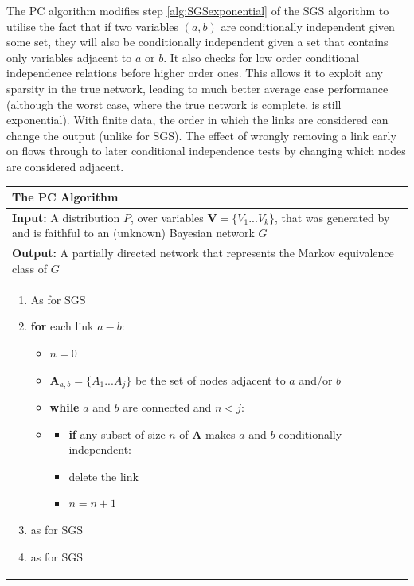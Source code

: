 \documentclass[11pt,a4paper,oneside]{book}
\theoremstyle{plain}
\theoremstyle{definition}
\begin{document}
The PC algorithm \citet{Sprites2000} modifies step \ref{alg:SGSexponential} of the SGS algorithm to utilise the fact that if two variables $(a,b)$ are conditionally independent given some set, they will also be conditionally independent given a set that contains only variables adjacent to $a$ or $b$. It also checks for low order conditional independence relations before higher order ones. This allows it to exploit any sparsity in the true network, leading to much better average case performance  \citep{Sprites2000} (although the worst case, where the true network is complete, is still exponential). With finite data, the order in which the links are considered can change the output (unlike for SGS). The effect of wrongly removing a link early on flows through to later conditional independence tests by changing which nodes are considered adjacent.

\begin{table}[H]
 \begin{tabularx}{\textwidth}{X}
 \hline
\rule{0pt}{2.5ex} 
 \textbf{The PC Algorithm}\\
 \hline
 \rule{0pt}{2.5ex}
\textbf{Input:} A distribution $P$, over variables $\boldsymbol{V} = \{V_{1}...V_{k}\}$, that was generated by and is faithful to an (unknown) Bayesian network $G$\\
\textbf{Output:} A partially directed network that represents the Markov equivalence class of $G$\\
 \begin{enumerate}[itemsep=8pt]
  \item As for SGS
  \item \textbf{for} each link $a-b$:
  \begin{itemize}[label={}]
   \item $n = 0$
   \item $\boldsymbol{A}_{a,b} = \{A_{1}...A_{j}\}$ be the set of nodes adjacent to $a$ and/or $b$
   \item \textbf{while} $a$ and $b$ are connected and $n < j$:
   \item 
    	\begin{itemize}[label={}]
    	\item \textbf{if} any subset of size $n$ of $\boldsymbol{A}$ makes $a$ and $b$ conditionally independent:
    	\item \begin{itemize}[label={}]
    			delete the link
    		  \end{itemize}
    	
    	\item $n = n+1$
    	\end{itemize}
  \end{itemize}   
  \item as for SGS
  \item as for SGS
\end{enumerate}\\
 \hline
\end{tabularx}
\end{table}
\end{document}
